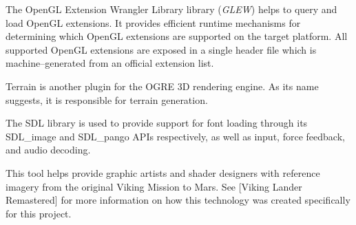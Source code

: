 
The OpenGL Extension Wrangler Library library ({\it GLEW}) helps to query and load OpenGL extensions. It provides efficient runtime mechanisms for determining which OpenGL extensions are supported on the target platform. All supported OpenGL extensions are exposed in a single header file which is machine--generated from an official extension list.


Terrain is another plugin for the OGRE 3D rendering engine. As its name suggests, it is responsible for terrain generation.


The SDL library is used to provide support for font loading through its SDL_image and SDL_pango APIs respectively, as well as input, force feedback, and audio decoding.


This tool helps provide graphic artists and shader designers with reference imagery from the original Viking Mission to Mars. See [Viking Lander Remastered] for more information on how this technology was created specifically for this project.
\stopitemize

